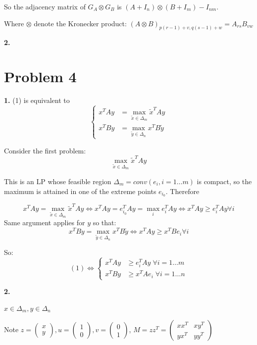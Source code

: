 \documentclass[11pt]{article}
\begin{document}
So the adjacency matrix of \(G_A \otimes G_B\) is \((A+I_{n}) \otimes (B+I_m) - I_{nm}\).

Where \(\otimes\) denote the Kronecker product: \((A\otimes B)_{p(r-1)+v, q(s-1)+w} = A_{rs} B_{vw}\)

\textbf{2.}




\section{Problem 4}
\label{sec:orgheadline6}

\textbf{1.}
(1) is equivalent to
\[\left\{\begin{array}{cc}
  x^TAy &= \max_{\tilde x \in \Delta_m} \tilde x^TAy\\
  x^TBy &= \max_{\tilde y \in \Delta_n}  x^TB\tilde y
  \end{array}\right.\]

Consider the first problem:
$$\max_{\tilde x \in \Delta_m} \tilde x^TAy$$

This is an LP whose feasible region   \(\Delta_m = conv(e_i, i=1\ldots m)\) is compact, so the maximum is attained in one of the extreme points \(e_{i_0}\). Therefore 

$$x^TAy = \max_{\tilde x \in \Delta_m} \tilde x^TAy \iff x^TAy = e_{i_0}^TAy = \max_{i} e_i^TAy \iff x^TAy \ge e_i^TAy \forall i$$
Same argument applies for \(y\) so that:
$$x^TBy = \max_{\tilde y \in \Delta_n} x^TB \tilde y  \iff x^TAy \ge x^TBe_i \forall i$$

So: \[(1) \iff \left\{\begin{array}{cc}
  x^TAy &\ge e_i^TAy \; \forall i = 1\ldots m\\
  x^TBy &\ge x^TAe_i \; \forall i = 1\ldots n
  \end{array}\right.\]

\textbf{2.}

\(x \in \Delta_m, y \in \Delta_n\)

Note \(z = \begin{pmatrix}x \\ y\end{pmatrix}, u = \begin{pmatrix}1 \\ 0\end{pmatrix}, v = \begin{pmatrix}0 \\ 1\end{pmatrix}\), 
\(M = zz^T = \begin{pmatrix}xx^T&xy^T\\yx^T&yy^T\end{pmatrix}\)
\end{document}
